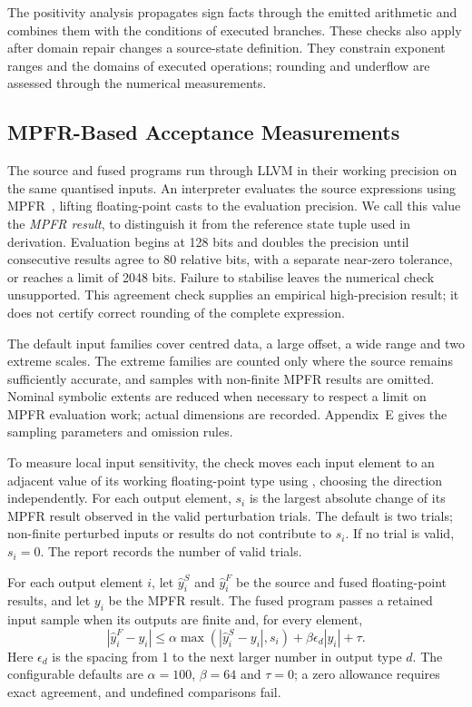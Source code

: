 The positivity analysis propagates sign facts through the emitted arithmetic and combines them with the conditions of executed branches.
These checks also apply after domain repair changes a source-state definition.
They constrain exponent ranges and the domains of executed operations; rounding and underflow are assessed through the numerical measurements.

\subsection{MPFR-Based Acceptance Measurements}

The source and fused programs run through LLVM in their working precision on the same quantised inputs.
An interpreter evaluates the source expressions using MPFR~\citep{mpfr}, lifting floating-point casts to the evaluation precision.
We call this value the \emph{MPFR result}, to distinguish it from the reference state tuple used in derivation.
Evaluation begins at 128 bits and doubles the precision until consecutive results agree to 80 relative bits, with a separate near-zero tolerance, or reaches a limit of 2048 bits.
Failure to stabilise leaves the numerical check unsupported.
This agreement check supplies an empirical high-precision result; it does not certify correct rounding of the complete expression.

The default input families cover centred data, a large offset, a wide range and two extreme scales.
The extreme families are counted only where the source remains sufficiently accurate, and samples with non-finite MPFR results are omitted.
Nominal symbolic extents are reduced when necessary to respect a limit on MPFR evaluation work; actual dimensions are recorded.
Appendix~E gives the sampling parameters and omission rules.

To measure local input sensitivity, the check moves each input element to an adjacent value of its working floating-point type using , choosing the direction independently.
For each output element, $s_i$ is the largest absolute change of its MPFR result observed in the valid perturbation trials.
The default is two trials; non-finite perturbed inputs or results do not contribute to $s_i$.
If no trial is valid, $s_i=0$.
The report records the number of valid trials.

\begin{definition}
\label{def:gate}
For each output element $i$, let $\hat y_i^{S}$ and $\hat y_i^{F}$ be the source and fused floating-point results, and let $y_i$ be the MPFR result.
The fused program passes a retained input sample when its outputs are finite and, for every element,
\[
|\hat y_i^{F}-y_i|
\leq
\alpha\max\!\left(|\hat y_i^{S}-y_i|,s_i\right)
+\beta\epsilon_d|y_i|+\tau.
\]
Here $\epsilon_d$ is the spacing from 1 to the next larger number in output type $d$.
The configurable defaults are $\alpha=100$, $\beta=64$ and $\tau=0$; a zero allowance requires exact agreement, and undefined comparisons fail.
\end{definition}

